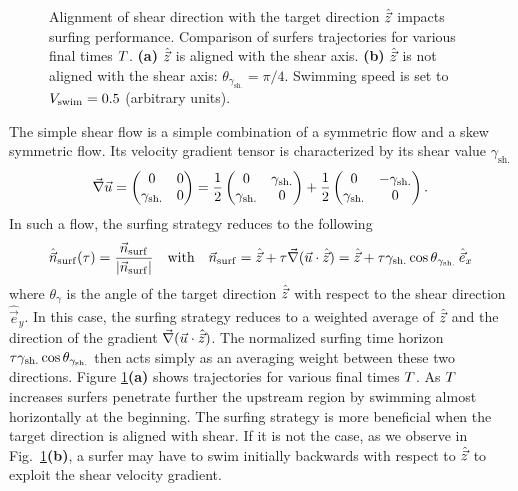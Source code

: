 \begin{figure}%
	\centering
	
	\caption[Alignment of shear direction with the target direction $\Direction$ impacts surfing performance.]{
		Alignment of shear direction with the target direction $\Direction$ impacts surfing performance.
		Comparison of surfers trajectories for various final times $T$.
		\textbf{(a)} $\Direction$ is aligned with the shear axis.
		\textbf{(b)} $\Direction$ is not aligned with the shear axis: $\theta_{\gamma_{\mathrm{sh.}}} = \pi/4$. 
		Swimming speed is set to $V_{\mathrm{swim}} = 0.5$ (arbitrary units).
	}
	\label{fig:simple_shear_surf}
\end{figure}
The simple shear flow is a simple combination of a symmetric flow and a skew symmetric flow. 
Its velocity gradient tensor is characterized by its shear value $\gamma_{\mathrm{sh.}}$
\begin{equation}\label{eq:taylor_green_vortex_velocity}
	\vec{\nabla} \vec{u} =
	\begin{pmatrix}
		0 & 0 \\
		\gamma_{\mathrm{sh.}} & 0
	\end{pmatrix} = \frac{1}{2}
	\begin{pmatrix}
		0 & \gamma_{\mathrm{sh.}} \\
		\gamma_{\mathrm{sh.}} & 0
	\end{pmatrix} + \frac{1}{2}
	\begin{pmatrix}
		0 & -\gamma_{\mathrm{sh.}} \\
		\gamma_{\mathrm{sh.}} & 0
	\end{pmatrix}.
\end{equation}
In such a flow, the surfing strategy reduces to the following
\begin{equation}
	\label{eq:optimal_swimming_direction_partial_asym}
	\hat{\vec{n}}_{\mathrm{surf}}(\tau) = \frac{\vec{n}_{\mathrm{surf}}}{\lvert\vec{n}_{\mathrm{surf}}\rvert} \quad \text{with} \quad \vec{n}_{\mathrm{surf}} = \hat{\vec{z}} + \tau \vec{\nabla} (\vec{u} \cdot \hat{\vec{z}}) = \hat{\vec{z}} + \tau \gamma_{\mathrm{sh.}} \cos \theta_{\gamma_{\mathrm{sh.}}} \, \hat{\vec{e}}_x
\end{equation}
where $\theta_\gamma$ is the angle of the target direction $\Direction$ with respect to the shear direction $\hat{\vec{e}}_y$.
In this case, the surfing strategy reduces to a weighted average of $\Direction$ and the direction of the gradient $\vec{\nabla} (\vec{u} \cdot \hat{\vec{z}})$. 
The normalized surfing time horizon $\tau \gamma_{\mathrm{sh.}} \cos \theta_{\gamma_{\mathrm{sh.}}}$ then acts simply as an averaging weight between these two directions.
Figure \ref{fig:simple_shear_surf}\textbf{(a)}  shows trajectories for various final times $T$.
As $T$ increases surfers penetrate further the upstream region by swimming almost horizontally at the beginning.
The surfing strategy is more beneficial when the target direction is aligned with shear.
If it is not the case, as we observe in Fig.~\ref{fig:simple_shear_surf}\textbf{(b)}, a surfer may have to swim initially backwards with respect to $\Direction$ to exploit the shear velocity gradient.

